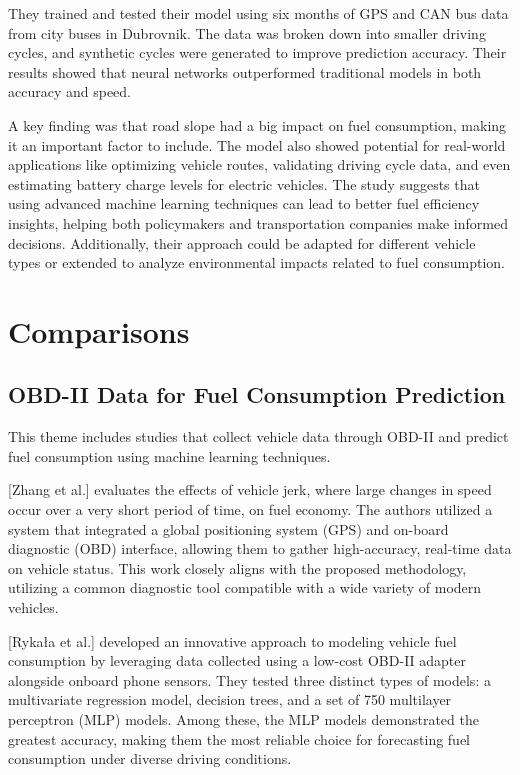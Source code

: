 \documentclass[letterpaper]{article}
\begin{document}
They trained and tested their model using six months of GPS and CAN bus data from city buses 
in Dubrovnik. The data was broken down into smaller driving cycles, and synthetic cycles 
were generated to improve prediction accuracy. Their results showed that neural networks 
outperformed traditional models in both accuracy and speed. 

A key finding was that road slope had a big impact on fuel consumption, making it an 
important factor to include. The model also showed potential for real-world applications 
like optimizing vehicle routes, validating driving cycle data, and even estimating battery
charge levels for electric vehicles. The study suggests that using advanced machine learning 
techniques can lead to better fuel efficiency insights, helping both policymakers and 
transportation companies make informed decisions. Additionally, their approach could be 
adapted for different vehicle types or extended to analyze environmental impacts related 
to fuel consumption.

\section*{Comparisons}


\subsection*{OBD-II Data for Fuel Consumption Prediction}

This theme includes studies that collect vehicle data through OBD-II and predict
fuel consumption using machine learning techniques. 

[Zhang et al.] evaluates the
effects of vehicle jerk, where large changes in speed occur over a very short
period of time, on fuel economy. The authors utilized a system that integrated a
global positioning system (GPS) and on-board diagnostic (OBD) interface,
allowing them to gather high-accuracy, real-time data on vehicle status. This
work closely aligns with the proposed methodology, utilizing a common diagnostic
tool compatible with a wide variety of modern vehicles. 

[Rykała et al.]
developed an innovative approach to modeling vehicle fuel consumption by
leveraging data collected using a low-cost OBD-II adapter alongside onboard
phone sensors. They tested three distinct types of models: a multivariate
regression model, decision trees, and a set of 750 multilayer perceptron (MLP)
models. Among these, the MLP models demonstrated the greatest accuracy, making
them the most reliable choice for forecasting fuel consumption under diverse
driving conditions. 
\end{document}
